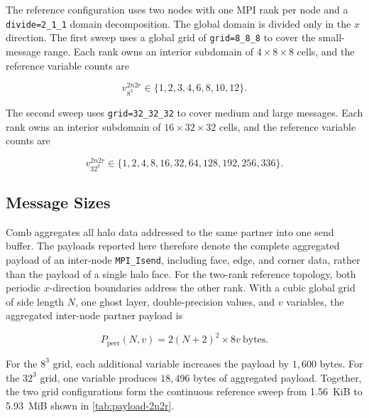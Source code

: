 The reference configuration uses two nodes with one MPI rank per node and a
\texttt{divide=2\_1\_1} domain decomposition. The global domain is divided only
in the $x$ direction. The first sweep uses a global grid of
\texttt{grid=8\_8\_8} to cover the small-message range. Each rank owns an
interior subdomain of $4\times8\times8$ cells, and the reference variable
counts are

\begin{equation}
	v_{8^3}^{2n2r} \in \{1,2,3,4,6,8,10,12\}.
\end{equation}

The second sweep uses \texttt{grid=32\_32\_32} to cover medium and large
messages. Each rank owns an interior subdomain of $16\times32\times32$ cells,
and the reference variable counts are

\begin{equation}
	v_{32^3}^{2n2r} \in \{1,2,4,8,16,32,64,128,192,256,336\}.
\end{equation}

\subsection{Message Sizes}

Comb aggregates all halo data addressed to the same partner into one send
buffer. The payloads reported here therefore denote the complete aggregated
payload of an inter-node \texttt{MPI\_Isend}, including face, edge, and corner
data, rather than the payload of a single halo face. For the two-rank reference
topology, both periodic $x$-direction boundaries address the other rank. With
a cubic global grid of side length $N$, one ghost layer, double-precision
values, and $v$ variables, the aggregated inter-node partner payload is

\begin{equation}
	P_{\mathrm{peer}}(N,v) = 2(N+2)^2 \times 8v \ \mathrm{bytes}.
\end{equation}

For the $8^3$ grid, each additional variable increases the payload by
$1{,}600$ bytes. For the $32^3$ grid, one variable produces $18{,}496$ bytes
of aggregated payload. Together, the two grid configurations form the
continuous reference sweep from 1.56~KiB to 5.93~MiB shown in
\autoref{tab:payload-2n2r}.

